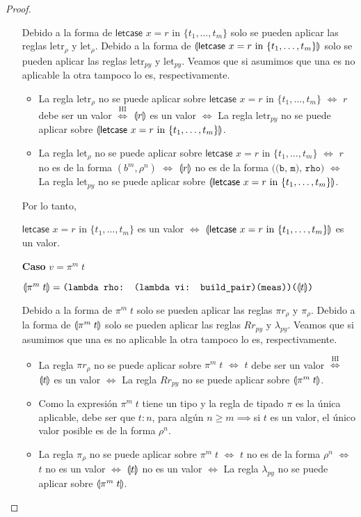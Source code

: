 \begin{proof}
\begin{itemize}
Debido a la forma de $\textsf{letcase }x = r \textrm{ in } \{t_1,\dots,t_m\} $ solo se pueden aplicar las reglas $\text{letr}_\rho$ y $\text{let}_\rho$. Debido a la forma de  $\llparenthesis \textsf{letcase }x = r \textrm{ in } \{t_1,\dots,t_m\}  \rrparenthesis$ solo se pueden aplicar las reglas $\text{letr}_\textit{py}$ y $\text{let}_\textit{py}$. Veamos que si asumimos que una es no aplicable la otra tampoco lo es, respectivamente.
\begin{itemize}
    \item La regla $\text{letr}_\rho$ no se puede aplicar sobre $\textsf{letcase }x = r \textrm{ in } \{t_1,\dots,t_m\} $ $\Leftrightarrow$ $r$ debe ser un valor $\stackrel{\textrm{HI}}{\Leftrightarrow}$ $\llparenthesis r \rrparenthesis$ es un valor $\Leftrightarrow$ La regla $\text{letr}_\textit{py}$ no se puede aplicar sobre $\llparenthesis \textsf{letcase }x = r \textrm{ in } \{t_1,\dots,t_m\}  \rrparenthesis$.
    \item  La regla $\text{let}_\rho$ no se puede aplicar sobre $\textsf{letcase }x = r \textrm{ in } \{t_1,\dots,t_m\} $ $\Leftrightarrow$ $r$ no es de la forma $(b^m, \rho^n)$ $\Leftrightarrow$ $\llparenthesis r \rrparenthesis$ no es de la forma $\texttt{((b, m), rho)}$ $\Leftrightarrow$ La regla $\text{let}_\textit{py}$ no se puede aplicar sobre $\llparenthesis \textsf{letcase }x = r \textrm{ in } \{t_1,\dots,t_m\}  \rrparenthesis$.
\end{itemize}

Por lo tanto,

$\textsf{letcase }x = r \textrm{ in } \{t_1,\dots,t_m\} $ es un valor $\Leftrightarrow$ $\llparenthesis \textsf{letcase }x = r \textrm{ in } \{t_1,\dots,t_m\} \rrparenthesis$ es un valor.

     \item[\textbf{Caso}] $v=\pi^m\;t$
     
$\llparenthesis \pi^m\;t \rrparenthesis = \texttt{(lambda rho: (lambda vi: build\_pair)(meas))(}\llparenthesis t \rrparenthesis\texttt{)}$

Debido a la forma de $\pi^m\;t$ solo se pueden aplicar las reglas $\pi r_\rho$ y $\pi_\rho$. Debido a la forma de  $\llparenthesis \pi^m\;t \rrparenthesis$ solo se pueden aplicar las reglas $Rr_\textit{py}$ y $\lambda_\textit{py}$. Veamos que si asumimos que una es no aplicable la otra tampoco lo es, respectivamente.
\begin{itemize}
    \item La regla $\pi r_\rho$ no se puede aplicar sobre $\pi^m\;t$ $\Leftrightarrow$ $t$ debe ser un valor $\stackrel{\textrm{HI}}{\Leftrightarrow}$ $\llparenthesis t \rrparenthesis$ es un valor $\Leftrightarrow$ La regla $Rr_\textit{py}$ no se puede aplicar sobre $\llparenthesis \pi^m\;t \rrparenthesis$.
    \item Como la expresión $\pi^m\;t$ tiene un tipo y la regla de tipado $\pi$ es la única aplicable, debe ser que $t: n$, para algún $n\geq m \implies$si $t$ es un valor, el único valor posible es de la forma $\rho^n$.
    \item  La regla $\pi_\rho$ no se puede aplicar sobre $\pi^m\;t$ $\Leftrightarrow$ $t$ no es de la forma $\rho^n$ $\Leftrightarrow$ $t$ no es un valor $\Leftrightarrow$ $\llparenthesis t \rrparenthesis$ no es un valor $\Leftrightarrow$ La regla $\lambda_\textit{py}$ no se puede aplicar sobre $\llparenthesis \pi^m\;t \rrparenthesis$.
\end{itemize}


\end{itemize}
\end{proof}
